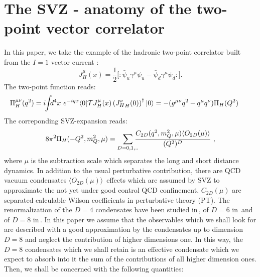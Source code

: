 \documentclass[review]{elsarticle}
\def\beq{\begin{equation}}
\def\eeq{\end{equation}}
\def\ga{\left(}
\def\dr{\right)}
\def\la{\langle}
\def\ra{\rangle}
\def\nin{\noindent}
\begin{document}
\section{The SVZ - anatomy of the two-point vector correlator}
\vspace*{-0.2cm}



 In this paper, we take  the example of the hadronic two-point correlator built from the $I=1$  vector current :
\beq
 J^\mu_H(x)=\frac{1}{2}{[}: \bar\psi_u\gamma^\mu\psi_u-\bar\psi_d\gamma^\mu\psi_d:{]}.
 \eeq
The two-point function reads: 
\beq
\hspace*{-0.6cm} \Pi^{\mu\nu}_H(q^2)=i\hspace*{-0.1cm}\int \hspace*{-0.15cm}d^4x ~e^{-iqx}\la 0\vert {\cal T} {J^\mu_H}(x)\ga {J^\nu_H}_H(0)\dr^\dagger \vert 0\ra=-(g^{\mu\nu}q^2-q^\mu q^\nu)\Pi_H(Q^2)
 \label{eq:2-point}
 \eeq
The correponding SVZ-expansion reads:
\beq
8\pi^2\Pi_H(-Q^2,m_Q^2,\mu)=\sum_{D=0,1,..}\hspace*{-0.25cm}\frac{C_{2D}(q^2,m_Q^2,\mu)\la O_{2D}(\mu)\ra}{(Q^2)^{D}}~, 
\label{eq:ope}
\eeq
where $\mu$ is the subtraction scale which separates the long and short distance dynamics. In addition to the usual perturbative contribution, there are QCD vacuum condensates $\la O_{2D}(\mu)\ra$\ effects which are assumed by SVZ to approximate  the not yet under good control QCD confinement.  $C_{2D}(\mu)$ are separated calculable Wilson coefficients in perturbative theory (PT).  The renormalization of the $D=4$ condensates have been studied in\,\cite{TARRACH,ESPRIU}, of $D=6$ in\,\cite{SNTARRACH} and of $D=8$ in\,\cite{BAGAN}.  In this paper we assume that the observables which we shall look for are described with a good approximation by the condensates up to dimension $D=8$ and neglect the contribution of higher dimensions one. In this way, the $D=8$ condensates which we shall retain is an effective condensate which we expect to absorb into it the sum of the contributions of all higher dimension ones. Then, we shall be concerned with the following quantities:
\end{document}
